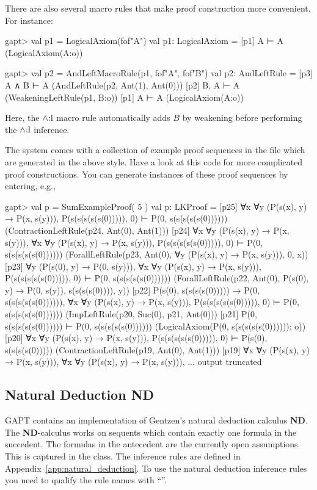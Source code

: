 \documentclass[a4paper,11pt]{book}
\renewcommand{\land}{\wedge}
\newcommand{\ND}{\textbf{ND}}
\newcommand{\mt}[1]{\textnormal{#1}}
\newcommand{\cli}[1]{{\ttfamily {#1}}}
\begin{document}
There are also several macro rules that make proof construction more convenient.
For instance:
\begin{clilisting}
gapt> val p1 = LogicalAxiom(fof"A")
val p1: LogicalAxiom = [p1] A ⊢ A    (LogicalAxiom(A:o))

gapt> val p2 = AndLeftMacroRule(p1, fof"A", fof"B")
val p2: AndLeftRule = [p3] A ∧ B ⊢ A    (AndLeftRule(p2, Ant(1), Ant(0)))
[p2] B, A ⊢ A    (WeakeningLeftRule(p1, B:o))
[p1] A ⊢ A    (LogicalAxiom(A:o))

\end{clilisting}
Here, the $\land\mt{:l}$ macro rule automatically adds $B$ by weakening before
performing the $\land\mt{:l}$ inference.

The system comes with a collection of example proof sequences in the file
\cli{examples/ProofSequences.scala} which are generated in the above style.
Have a look at this code for more complicated proof constructions.
You can generate instances of these proof sequences by entering, e.g.,
\begin{clilisting}
gapt> val p = SumExampleProof( 5 )
val p: LKProof = [p25] ∀x ∀y (P(s(x), y) → P(x, s(y))), P(s(s(s(s(s(0))))), 0) ⊢ P(0, s(s(s(s(s(0))))))    (ContractionLeftRule(p24, Ant(0), Ant(1)))
[p24] ∀x ∀y (P(s(x), y) → P(x, s(y))),
∀x ∀y (P(s(x), y) → P(x, s(y))),
P(s(s(s(s(s(0))))), 0)
⊢
P(0, s(s(s(s(s(0))))))    (ForallLeftRule(p23, Ant(0), ∀y (P(s(x), y) → P(x, s(y))), 0, x))
[p23] ∀y (P(s(0), y) → P(0, s(y))),
∀x ∀y (P(s(x), y) → P(x, s(y))),
P(s(s(s(s(s(0))))), 0)
⊢
P(0, s(s(s(s(s(0))))))    (ForallLeftRule(p22, Ant(0), P(s(0), y) → P(0, s(y)), s(s(s(s(0)))), y))
[p22] P(s(0), s(s(s(s(0))))) → P(0, s(s(s(s(s(0)))))),
∀x ∀y (P(s(x), y) → P(x, s(y))),
P(s(s(s(s(s(0))))), 0)
⊢
P(0, s(s(s(s(s(0))))))    (ImpLeftRule(p20, Suc(0), p21, Ant(0)))
[p21] P(0, s(s(s(s(s(0)))))) ⊢ P(0, s(s(s(s(s(0))))))    (LogicalAxiom(P(0, s(s(s(s(s(0)))))): o))
[p20] ∀x ∀y (P(s(x), y) → P(x, s(y))), P(s(s(s(s(s(0))))), 0) ⊢ P(s(0), s(s(s(s(0)))))    (ContractionLeftRule(p19, Ant(0), Ant(1)))
[p19] ∀x ∀y (P(s(x), y) → P(x, s(y))),
∀x ∀y (P(s(x), y) → P(x, s(y))),
... output truncated

\end{clilisting}

\subsection{Natural Deduction ND}

GAPT contains an implementation of Gentzen's natural deduction calculus {\ND}.
The {\ND}-calculus works on sequents which contain exactly one formula in the succedent.
The formulas in the antecedent are the currently open assumptions. This is captured
in the \cli{NDSequent} class. The inference rules are defined in Appendix~\ref{app:natural_deduction}.
To use the natural deduction inference rules you need to qualify the rule names with ``\cli{nd.}''.
\end{document}

